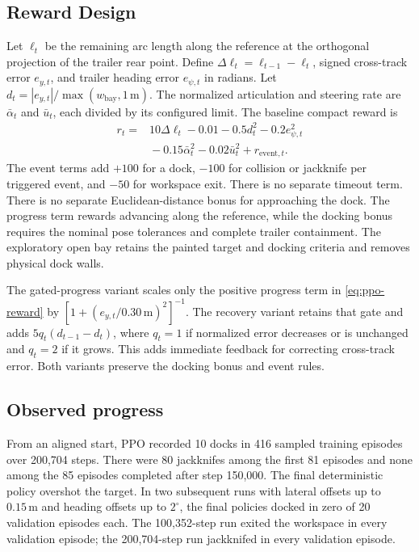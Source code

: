\documentclass[conference]{IEEEtran}
\begin{document}
\subsection{Reward Design}
Let $\ell_t$ be the remaining arc length along the reference at the
orthogonal projection of the trailer rear point. Define
$\Delta\ell_t=\ell_{t-1}-\ell_t$, signed cross-track error $e_{y,t}$,
and trailer heading error $e_{\psi,t}$ in radians. Let
$d_t=|e_{y,t}|/\max(w_{\mathrm{bay}},1\,\mathrm{m})$.
The normalized articulation and steering rate are $\bar\alpha_t$ and
$\bar u_t$, each divided by its configured limit. The baseline compact
reward is
\begin{equation}
\begin{aligned}
r_t ={}& 10\Delta\ell_t-0.01-0.5d_t^2-0.2e_{\psi,t}^2\\
       & {}-0.15\bar\alpha_t^2-0.02\bar u_t^2+r_{\mathrm{event},t}.
\end{aligned}
\label{eq:ppo-reward}
\end{equation}
The event terms add $+100$ for a dock, $-100$ for collision or jackknife
per triggered event, and $-50$ for workspace exit. There is no separate
timeout term. There is no separate Euclidean-distance bonus for
approaching the dock. The progress term rewards advancing along the
reference, while the docking bonus requires the nominal pose tolerances
and complete trailer containment. The exploratory open bay retains the
painted target and docking criteria and removes physical dock walls.

The gated-progress variant scales only the positive progress term in
\eqref{eq:ppo-reward} by $[1+(e_{y,t}/0.30\,\mathrm{m})^2]^{-1}$.
The recovery variant retains that gate and adds
$5q_t(d_{t-1}-d_t)$, where $q_t=1$ if normalized error decreases or is
unchanged and $q_t=2$ if it grows. This adds immediate feedback for
correcting cross-track error. Both variants preserve the docking bonus
and event rules.

\subsection{Observed progress}
From an aligned start, PPO recorded 10 docks in 416 sampled training
episodes over 200,704 steps. There were 80 jackknifes among the first 81
episodes and none among the 85 episodes completed after step 150,000.
The final deterministic policy overshot the target. In two subsequent
runs with lateral offsets up to $0.15\,\mathrm{m}$ and heading offsets up to
$2^\circ$, the final policies docked in zero of 20 validation episodes each.
The 100,352-step run exited the workspace in every validation episode;
the 200,704-step run jackknifed in every validation episode.
\end{document}
